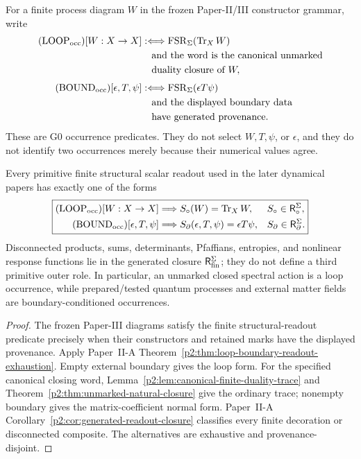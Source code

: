\documentclass[12pt,a4paper]{article}
\begin{document}
\begin{definition}
\label{p3a:def:dynamical-readout-occurrences}
For a finite process diagram \(W\) in the frozen Paper-II/III constructor
grammar, write
\[
\begin{aligned}
 (\mathrm{LOOP}_{\rm occ})[W:X\to X]
 &:\Longleftrightarrow
 \operatorname{FSR}_{\Sigma}(\operatorname{Tr}_X W)\\
 &\quad\text{and the word is the canonical unmarked}\\
 &\quad\text{duality closure of }W,\\[0.35em]
 (\mathrm{BOUND}_{\rm occ})[\epsilon,T,\psi]
 &:\Longleftrightarrow
 \operatorname{FSR}_{\Sigma}(\epsilon T\psi)\\
 &\quad\text{and the displayed boundary data}\\
 &\quad\text{have generated provenance}.
\end{aligned}
\]
These are G0 occurrence predicates.  They do not select \(W,T,\psi\), or
\(\epsilon\), and they do not identify two occurrences merely because their
numerical values agree.
\end{definition}

\begin{theorem}
\label{p3a:thm:two-branch-dynamical-handoff}
Every primitive finite structural scalar readout used in the later dynamical
papers has exactly one of the forms
\[
\boxed{
\begin{aligned}
 (\mathrm{LOOP}_{\rm occ})[W:X\to X]
 &\Longrightarrow S_{\circ}(W)=\operatorname{Tr}_XW,
 &&S_{\circ}\in\mathsf R_{\circ}^{\Sigma},\\
 (\mathrm{BOUND}_{\rm occ})[\epsilon,T,\psi]
 &\Longrightarrow S_{\partial}(\epsilon,T,\psi)=\epsilon T\psi,
 &&S_{\partial}\in\mathsf R_{\partial}^{\Sigma}.
\end{aligned}}
\]
Disconnected products, sums, determinants, Pfaffians, entropies, and nonlinear
response functions lie in the generated closure \(\mathsf R_{\mathrm{fin}}^{\Sigma}\); they do not define
a third primitive outer role.  In particular, an unmarked closed spectral
action is a loop occurrence, while prepared/tested quantum processes and
external matter fields are boundary-conditioned occurrences.
\end{theorem}

\begin{proof}
The frozen Paper-III diagrams satisfy the finite structural-readout predicate
precisely when their constructors and retained marks have the displayed
provenance.  Apply Paper~II-A
Theorem~\ref{p2:thm:loop-boundary-readout-exhaustion}.  Empty external
boundary gives the loop form. For the specified canonical closing word,
Lemma~\ref{p2:lem:canonical-finite-duality-trace} and
Theorem~\ref{p2:thm:unmarked-natural-closure} give the ordinary trace;
nonempty boundary gives the
matrix-coefficient normal form.  Paper~II-A
Corollary~\ref{p2:cor:generated-readout-closure} classifies every finite
decoration or disconnected composite.  The alternatives are exhaustive and
provenance-disjoint.
\end{proof}
\end{document}
